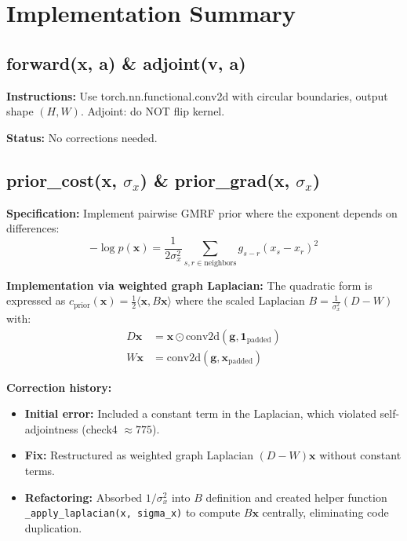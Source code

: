 \documentclass[12pt]{article}
\begin{document}
\section*{Implementation Summary}

\subsection*{forward(x, a) \& adjoint(v, a)}

\textbf{Instructions:} Use torch.nn.functional.conv2d with circular boundaries, output shape $(H, W)$. Adjoint: do NOT flip kernel.

\textbf{Status:} No corrections needed.

\subsection*{prior\_cost(x, $\sigma_x$) \& prior\_grad(x, $\sigma_x$)}

\textbf{Specification:} Implement pairwise GMRF prior where the exponent depends on differences:
\begin{equation*}
-\log p(\mathbf{x}) = \frac{1}{2\sigma_x^2} \sum_{s,r \in \text{neighbors}} g_{s-r}(x_s - x_r)^2
\end{equation*}

\textbf{Implementation via weighted graph Laplacian:} The quadratic form is expressed as $c_{\text{prior}}(\mathbf{x}) = \frac{1}{2} \langle \mathbf{x}, B\mathbf{x} \rangle$ where the scaled Laplacian $B = \frac{1}{\sigma_x^2}(D - W)$ with:
\begin{align*}
D\mathbf{x} &= \mathbf{x} \odot \text{conv2d}(\mathbf{g}, \mathbf{1}_{\text{padded}}) \\
W\mathbf{x} &= \text{conv2d}(\mathbf{g}, \mathbf{x}_{\text{padded}})
\end{align*}

\textbf{Correction history:}
\begin{itemize}
\item \textbf{Initial error:} Included a constant term in the Laplacian, which violated self-adjointness (check4 $\approx 775$).
\item \textbf{Fix:} Restructured as weighted graph Laplacian $(D-W)\mathbf{x}$ without constant terms.
\item \textbf{Refactoring:} Absorbed $1/\sigma_x^2$ into $B$ definition and created helper function \texttt{\_apply\_laplacian(x, sigma\_x)} to compute $B\mathbf{x}$ centrally, eliminating code duplication.
\end{itemize}
\end{document}
